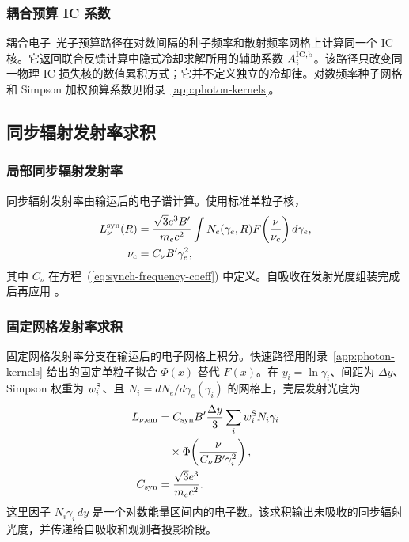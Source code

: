 \documentclass[twocolumn]{aastex702}
\begin{document}
\subsubsection{耦合预算 IC 系数}

耦合电子--光子预算路径在对数间隔的种子频率和散射频率网格上计算同一个 IC 核。它返回联合反馈计算中隐式冷却求解所用的辅助系数 \(A_i^{\rm IC,b}\)。该路径只改变同一物理 IC 损失核的数值累积方式；它并不定义独立的冷却律。对数频率种子网格和 Simpson 加权预算系数见附录~\ref{app:photon-kernels}。

\subsection{同步辐射发射率求积}

\subsubsection{局部同步辐射发射率}

同步辐射发射率由输运后的电子谱计算。使用标准单粒子核，
\begin{equation}
\begin{aligned}
L_\nu^{\rm syn}(R)&=
\frac{\sqrt{3}e^3B'}{m_e c^2}
\int N_e(\gamma_e,R)
F\!\left(\frac{\nu}{\nu_c}\right)d\gamma_e,\\
\nu_c&=C_\nu B'\gamma_e^2,
\end{aligned}
\end{equation}
其中 \(C_\nu\) 在方程~(\ref{eq:synch-frequency-coeff}) 中定义。自吸收在发射光度组装完成后再应用 \citep{RybickiLightman1979,Sari1998,Granot2002}。

\subsubsection{固定网格发射率求积}

固定网格发射率分支在输运后的电子网格上积分。快速路径用附录~\ref{app:photon-kernels} 给出的固定单粒子拟合 \(\Phi(x)\) 替代 \(F(x)\)。在 \(y_i=\ln\gamma_i\)、间距为 \(\Delta y\)、Simpson 权重为 \(w_i^{\rm S}\)、且 \(N_i=dN_e/d\gamma_e(\gamma_i)\) 的网格上，壳层发射光度为
\begin{equation}
\begin{aligned}
L_{\nu,{\rm em}}&=
C_{\rm syn}B'\frac{\Delta y}{3}
\sum_i w_i^{\rm S}N_i\gamma_i\\
&\quad\times
\Phi\!\left(\frac{\nu}{C_\nu B'\gamma_i^2}\right),\\
C_{\rm syn}&=\frac{\sqrt{3}e^3}{m_e c^2}.
\end{aligned}
\end{equation}
这里因子 \(N_i\gamma_i\,dy\) 是一个对数能量区间内的电子数。该求积输出未吸收的同步辐射光度，并传递给自吸收和观测者投影阶段。
\end{document}
